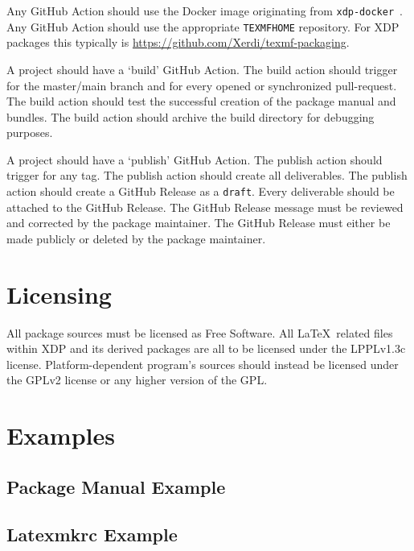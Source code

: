 \documentclass{xdpdoc}
\begin{document}
    Any GitHub Action should use the Docker image originating from \texttt{xdp-docker}~\cite{xdp-docker}.
    Any GitHub Action should use the appropriate \texttt{TEXMFHOME} repository.
    For XDP packages this typically is \url{https://github.com/Xerdi/texmf-packaging}.

    A project should have a `build' GitHub Action.
    The build action should trigger for the master/main branch and for every opened or synchronized pull-request.
    The build action should test the successful creation of the package manual and bundles.
    The build action should archive the build directory for debugging purposes.

    A project should have a `publish' GitHub Action.
    The publish action should trigger for any tag.
    The publish action should create all deliverables.
    The publish action should create a GitHub Release as a \texttt{draft}.
    Every deliverable should be attached to the GitHub Release.
    The GitHub Release message must be reviewed and corrected by the package maintainer.
    The GitHub Release must either be made publicly or deleted by the package maintainer.

    \section{Licensing}

    All package sources must be licensed as Free Software.
    All \LaTeX\ related files within XDP and its derived packages are all to be licensed under the LPPLv1.3c license.
    Platform-dependent program's sources should instead be licensed under the GPLv2 license or any higher version of the GPL\@.

    \clearpage

    \section{Examples}

    \subsection{Package Manual Example}

    

    \clearpage
    \subsection{Latexmkrc Example}
\end{document}
